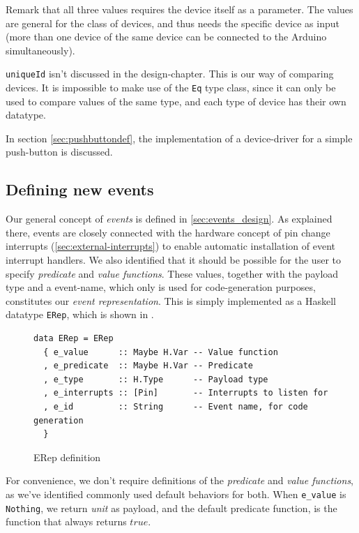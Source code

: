 \documentclass[a4paper, oneside, final]{memoir}
\let\Fref\undefined
\begin{document}
Remark that all three values requires the device itself as a
parameter. The values are general for the class of devices, and thus
needs the specific device as input (more than one device of the same
device can be connected to the Arduino simultaneously).

\texttt{uniqueId} isn't discussed in the design-chapter. This is our
way of comparing devices. It is impossible to make use of the
\verb|Eq| type class, since it can only be used to compare values of
the same type, and each type of device has their own datatype.


In section \ref{sec:pushbuttondef}, the implementation of a
device-driver for a simple push-button is discussed.


\subsection{Defining new events}
\label{sec:defining events}
Our general concept of \textit{events} is defined in
\ref{sec:events_design}. As explained there, events are closely
connected with the hardware concept of pin change interrupts
(\ref{sec:external-interrupts}) to enable automatic installation of event
interrupt handlers. We also identified that it should be possible for
the user to specify \textit{predicate} and \textit{value functions}. 
These values, together with the payload type and a event-name, which
only is used for code-generation purposes, constitutes our
\textit{event representation}. This is simply implemented as a Haskell
datatype \verb|ERep|, which is shown in \Fref{fig:Erep}. 

\begin{figure}
  \centering
\begin{verbatim}
data ERep = ERep
  { e_value      :: Maybe H.Var -- Value function
  , e_predicate  :: Maybe H.Var -- Predicate
  , e_type       :: H.Type      -- Payload type
  , e_interrupts :: [Pin]       -- Interrupts to listen for
  , e_id         :: String      -- Event name, for code generation
  }
\end{verbatim}

  \caption{ERep definition}
  \label{fig:Erep}
\end{figure}

For convenience, we don't require definitions of the
\textit{predicate} and \textit{value functions}, as we've identified
commonly used default behaviors for both. When \verb|e_value| is
\verb|Nothing|, we return \textit{unit} as payload, and the default
predicate function, is the function that always returns $true$.
\end{document}
